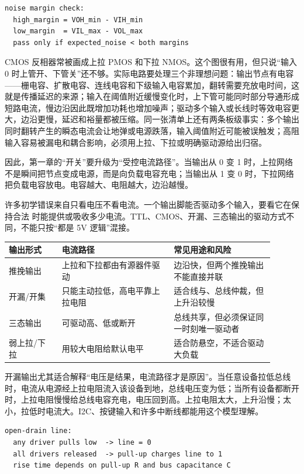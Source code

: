 \begin{lstlisting}
noise margin check:
  high_margin = VOH_min - VIH_min
  low_margin  = VIL_max - VOL_max
  pass only if expected_noise < both margins
\end{lstlisting}

CMOS 反相器常被画成上拉 PMOS 和下拉 NMOS。这个图很有用，但只说“输入 0 时上管开、下管关”还不够。实际电路要处理三个非理想问题：输出节点有电容——栅电容、扩散电容、连线电容和下级输入电容累加，翻转需要充放电时间，这就是传播延迟的来源；输入在阈值附近缓慢变化时，上下管可能同时部分导通形成短路电流，慢边沿因此既增加功耗也增加噪声；驱动多个输入或长线时等效电容更大，边沿更慢，延迟和裕量都被压缩。同一张清单上还有两条板级事实：多个输出同时翻转产生的瞬态电流会让地弹或电源跌落，输入阈值附近可能被误触发；高阻输入容易被漏电和耦合影响，必须用上拉、下拉或明确驱动源给出归宿。

因此，第一章的“开关”要升级为“受控电流路径”。当输出从 0 变 1 时，上拉网络不是瞬间把节点变成电源，而是向负载电容充电；当输出从 1 变 0 时，下拉网络把负载电容放电。电容越大、电阻越大，边沿越慢。

许多初学错误来自只看电压不看电流。一个输出脚能否驱动多个输入，要看它在保持合法  时能提供或吸收多少电流。TTL、CMOS、开漏、三态输出的驱动方式不同，不能只按“都是 5V 逻辑”混接。

\begin{longtable}{L{0.18\linewidth}L{0.38\linewidth}L{0.34\linewidth}}
\toprule
输出形式 & 电流路径 & 常见用途和风险 \\
\midrule
推挽输出 & 上拉和下拉都由有源器件驱动 & 边沿快，但两个推挽输出不能直接并联 \\
开漏/开集 & 只能主动拉低，高电平靠上拉电阻 & 适合线与、总线仲裁，但上升沿较慢 \\
三态输出 & 可驱动高、低或断开 & 总线共享，但必须保证同一时刻唯一驱动者 \\
弱上拉/下拉 & 用较大电阻给默认电平 & 适合防悬空，不适合驱动大负载 \\
\bottomrule
\end{longtable}

开漏输出尤其适合解释“电压是结果，电流路径才是原因”。当任意设备拉低总线时，电流从电源经上拉电阻流入该设备到地，总线电压变为低；当所有设备都断开时，上拉电阻慢慢给总线电容充电，电压回到高。上拉电阻太大，上升沿慢；太小，拉低时电流大。I2C、按键输入和许多中断线都能用这个模型理解。

\begin{lstlisting}
open-drain line:
  any driver pulls low  -> line = 0
  all drivers released  -> pull-up charges line to 1
  rise time depends on pull-up R and bus capacitance C
\end{lstlisting}

